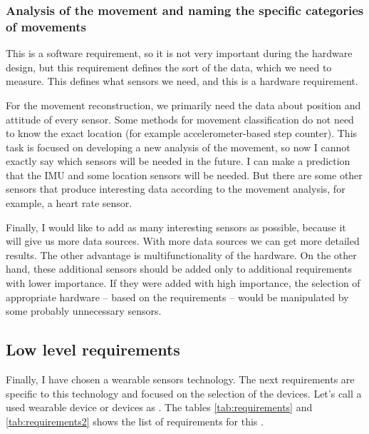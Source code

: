 \subsubsection{Analysis of the movement and naming the specific categories of movements}
This is a software requirement, so it is not very important during the hardware design, but this requirement defines the sort of the data, which we need to measure. This defines what sensors we need, and this is a hardware requirement.

For the movement reconstruction, we primarily need the data about position and attitude of every sensor. Some methods for movement classification do not need to know the exact location (for example accelerometer-based step counter). This task is focused on developing a new analysis of the movement, so now I cannot exactly say which sensors will be needed in the future. I can make a prediction that the \ac{IMU} and some location sensors will be needed. But there are some other sensors that produce interesting data according to the movement analysis, for example, a heart rate sensor.

Finally, I would like to add as many interesting sensors as possible, because it will give us more data sources. With more data sources we can get more detailed results. The other advantage is multifunctionality of the hardware. On the other hand, these additional sensors should be added only to additional requirements with lower importance. If they were added with high importance, the selection of appropriate hardware -- based on the requirements -- would be manipulated by some probably unnecessary sensors.

\subsection{Low level requirements}
Finally, I have chosen a wearable sensors technology. The next requirements are specific to this technology and focused on the selection of the devices. Let's call a used wearable device or devices as . The tables \ref{tab:requirements} and \ref{tab:requirements2} shows the list of requirements for this .

